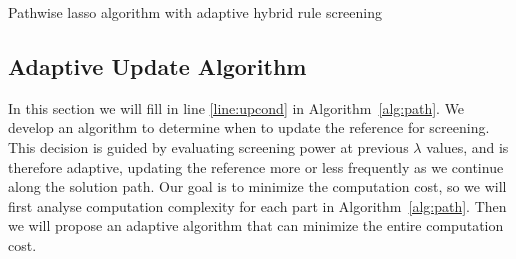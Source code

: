 \begin{algorithm}[H]
  \label{alg:path}
    \SetAlgoLined
    \BlankLine
    
    \caption{Pathwise lasso algorithm with adaptive hybrid rule screening}
\end{algorithm}

\subsection{Adaptive Update Algorithm}
\label{sec:adaptive}

In this section we will fill in line \ref{line:upcond} in Algorithm~\ref{alg:path}. We develop an algorithm to determine when to update the reference for screening. This decision is guided by evaluating screening power at previous $\lambda$ values, and is therefore adaptive, updating the reference more or less frequently as we continue along the solution path. Our goal is to minimize the computation cost, so we will first analyse computation complexity for each part in Algorithm~\ref{alg:path}. Then we will propose an adaptive algorithm that can minimize the entire computation cost.


